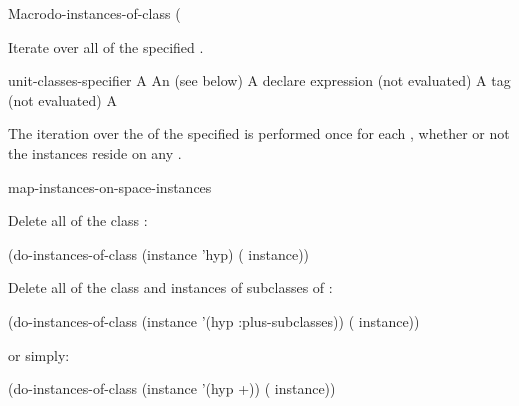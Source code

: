\documentclass[10pt,twoside,english,pdftex]{article}
\begin{document}

\begin{functiondoc}{Macro}{do-instances-of-class}%
  {(
    \superstar{} 
    }
%
%

\fnsyntax

\fnpurpose Iterate over all  of the specified
.

\fnpackage {}

\fnmodule {}

\fnargs
\begin{args}{unit-classes-specifier}
\arg[var] A 
 An 
(see below)
\arg[declaration] A declare expression (not evaluated)
\arg[tag] A  tag (not evaluated)
\arg[form] A 
\end{args}

\fndsyntax
\W\supp\tabletop
\unitclassesspec
\subclassingspec

\fndescription The iteration over the  of the specified
 is performed once for each , whether
or not the instances reside on any .

\begin{alsos}{map-instances-on-space-instances}
\end{alsos}

\fnexamples
Delete all  of the class :
%
\W\supp
\begin{example}
  (do-instances-of-class (instance 'hyp)
    ( instance))
\end{example} 
%
Delete all  of the class  and
instances of subclasses of :
%
\W\supp\notpretop
\begin{example}
  (do-instances-of-class (instance '(hyp :plus-subclasses))
    ( instance))
\end{example} 
%
or simply:
%
\W\supp\notpretop
\begin{example}
  (do-instances-of-class (instance '(hyp +))
    ( instance))
\end{example} 


\end{functiondoc}
\end{document}
